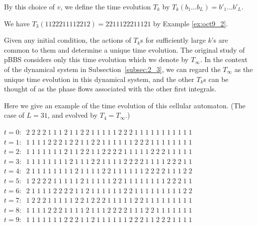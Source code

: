 \documentclass[pdftex]{sigma}
\begin{document}
By this choice of $v$, we def\/ine the time evolution $T_k$ by
$T_k (b_1 \dots b_L) = b'_1 \dots  b'_L$.
\begin{example}
We have
$T_3 (1122211112212) = 2211122211121$ by Example \ref{ex:oct9_2}.
\end{example}

\begin{remark}\label{rem:may19_1}
Given any initial condition,
the actions of $T_k$s for suf\/f\/iciently large $k$'s are common to them and determine a unique time evolution.
The original study of pBBS \cite{YT, YYT} considers only this time evolution which we denote by $T_\infty$.
{In the context of the dynamical system in Subsection~\ref{subsec:2_3},
we can regard the $T_\infty$ as the unique time evolution in this dynamical system, and the other $T_k$s can be thought of as the phase f\/lows
associated with the other f\/irst integrals.}
\end{remark}


Here we give an example of the time evolution of this cellular automaton. (The case of $L=31$, and evolved by $T_4=T_\infty$.)

\begin{center}
$t=0: \;\;2\; 2\; 2\; 2\; 1\; 1\; 1\; 2\; 1\; 1\; 2\; 2\; 1\; 1\; 1\; 1\; 1\; 2\; 2\; 2\; 1\; 1\; 1\; 1\; 1\; 1\; 1\; 1\; 1\; 1\; 1$\\
$t=1: \;\;1\; 1\; 1\; 1\; 2\; 2\; 2\; 1\; 2\; 2\; 1\; 1\; 2\; 2\; 1\; 1\; 1\; 1\; 1\; 1\; 2\; 2\; 2\; 1\; 1\; 1\; 1\; 1\; 1\; 1\; 1$\\
$t=2: \;\;1\; 1\; 1\; 1\; 1\; 1\; 1\; 2\; 1\; 1\; 2\; 2\; 1\; 1\; 2\; 2\; 2\; 2\; 1\; 1\; 1\; 1\; 1\; 2\; 2\; 2\; 1\; 1\; 1\; 1\; 1$\\
$t=3: \;\;1\; 1\; 1\; 1\; 1\; 1\; 1\; 1\; 2\; 1\; 1\; 1\; 2\; 2\; 1\; 1\; 1\; 1\; 2\; 2\; 2\; 2\; 1\; 1\; 1\; 1\; 2\; 2\; 2\; 1\; 1$\\
$t=4: \;\;2\; 1\; 1\; 1\; 1\; 1\; 1\; 1\; 1\; 2\; 1\; 1\; 1\; 1\; 2\; 2\; 1\; 1\; 1\; 1\; 1\; 1\; 2\; 2\; 2\; 2\; 1\; 1\; 1\; 2\; 2$\\
$t=5: \;\;1\; 2\; 2\; 2\; 2\; 1\; 1\; 1\; 1\; 1\; 2\; 1\; 1\; 1\; 1\; 1\; 2\; 2\; 1\; 1\; 1\; 1\; 1\; 1\; 1\; 1\; 2\; 2\; 2\; 1\; 1$\\
$t=6: \;\;2\; 1\; 1\; 1\; 1\; 2\; 2\; 2\; 2\; 1\; 1\; 2\; 1\; 1\; 1\; 1\; 1\; 1\; 2\; 2\; 1\; 1\; 1\; 1\; 1\; 1\; 1\; 1\; 1\; 2\; 2$\\
$t=7: \;\;1\; 2\; 2\; 2\; 1\; 1\; 1\; 1\; 1\; 2\; 2\; 1\; 2\; 2\; 2\; 1\; 1\; 1\; 1\; 1\; 2\; 2\; 1\; 1\; 1\; 1\; 1\; 1\; 1\; 1\; 1$\\
$t=8: \;\;1\; 1\; 1\; 1\; 2\; 2\; 2\; 1\; 1\; 1\; 1\; 2\; 1\; 1\; 1\; 2\; 2\; 2\; 2\; 1\; 1\; 1\; 2\; 2\; 1\; 1\; 1\; 1\; 1\; 1\; 1$\\
$t=9: \;\;1\; 1\; 1\; 1\; 1\; 1\; 1\; 2\; 2\; 2\; 1\; 1\; 2\; 1\; 1\; 1\; 1\; 1\; 1\; 2\; 2\; 2\; 1\; 1\; 2\; 2\; 2\; 1\; 1\; 1\; 1$
\end{center}
\end{document}
